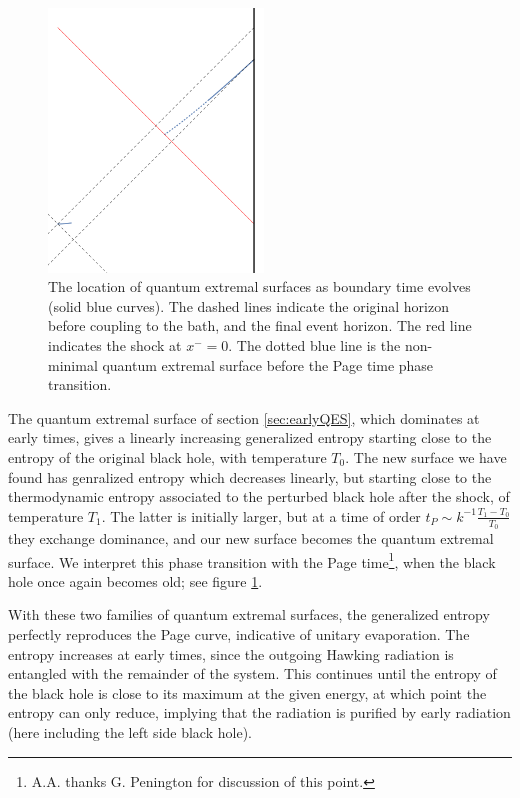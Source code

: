 \documentclass[12pt]{article}
\begin{document}
\begin{figure}
\begin{center}
	\includegraphics[height=7cm]{QESdiagram.pdf}
	\end{center}
	\caption{The location of quantum extremal surfaces as boundary time evolves (solid blue curves). The dashed lines indicate the original horizon before coupling to the bath, and the final event horizon. The red line indicates the shock at $x^-=0$. The dotted blue line is the non-minimal quantum extremal surface before the Page time phase transition.}
\label{fig:QESDiagram}
\end{figure}










The quantum extremal surface of section \ref{sec:earlyQES}, which dominates at early times, gives a linearly increasing generalized entropy starting close to the entropy of the original black hole, with temperature $T_0$. The new surface we have found has genralized entropy which decreases linearly, but starting close to the thermodynamic entropy associated to the perturbed black hole after the shock, of temperature $T_1$. The latter is initially larger, but at a time of order $t_P\sim k^{-1}\frac{T_1-T_0}{T_0}$ they exchange dominance, and our new surface becomes the quantum extremal surface. We interpret this phase transition with the Page time\footnote{A.A. thanks G. Penington for discussion of this point.}, when the black hole once again becomes old; see figure \ref{fig:QESDiagram}.

With these two families of quantum extremal surfaces, the generalized entropy perfectly reproduces the Page curve, indicative of unitary evaporation. The entropy increases at early times, since the outgoing Hawking radiation is entangled with the remainder of the system. This continues until the entropy of the black hole is close to its maximum at the given energy, at which point the entropy can only reduce, implying that the radiation is purified by early radiation (here including the left side black hole).
\end{document}
